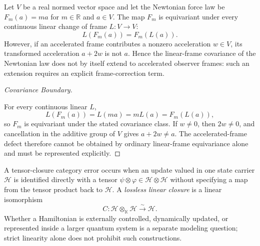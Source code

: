 \begin{proposition}
\label{proposition:bk1_newtonian_incompleteness}
Let \(V\) be a real normed vector space and let the Newtonian force law be
\(F_m(a)=m a\) for \(m\in\mathbb{R}\) and \(a\in V\).  The map \(F_m\) is
equivariant under every continuous linear change of frame \(L:V\to V\):
\[
  L(F_m(a))=F_m(L(a)).
\]
However, if an accelerated frame contributes a nonzero acceleration
\(w\in V\), its transformed acceleration \(a+2w\) is not \(a\).  Hence the
linear-frame covariance of the Newtonian law does not by itself extend to
accelerated observer frames: such an extension requires an explicit
frame-correction term.
\end{proposition}
\begin{proof}[Covariance Boundary]
\label{proof:bk1_newtonian_incompleteness}
\leavevmode

For every continuous linear \(L\),
\[
  L(F_m(a))=L(ma)=mL(a)=F_m(L(a)),
\]
so \(F_m\) is equivariant under the stated covariance class.  If \(w\ne0\),
then \(2w\ne0\), and cancellation in the additive group of \(V\) gives
\(a+2w\ne a\).  The accelerated-frame defect therefore cannot be obtained by
ordinary linear-frame equivariance alone and must be represented explicitly.
\end{proof}

\begin{definition}
\label{definition:bk1_quantum_category_error}
A tensor-closure category error occurs when an update valued in one state
carrier \(\mathcal H\) is identified directly with a tensor
\(\psi\otimes\varphi\in\mathcal H\otimes\mathcal H\) without specifying a
map from the tensor product back to \(\mathcal H\).  A \emph{lossless linear
closure} is a linear isomorphism
\[
 C:\mathcal H\otimes_{\mathbb K}\mathcal H
   \overset{\sim}{\longrightarrow}\mathcal H.
\]
Whether a Hamiltonian is externally controlled, dynamically updated, or
represented inside a larger quantum system is a separate modeling question;
strict linearity alone does not prohibit such constructions.
\end{definition}

